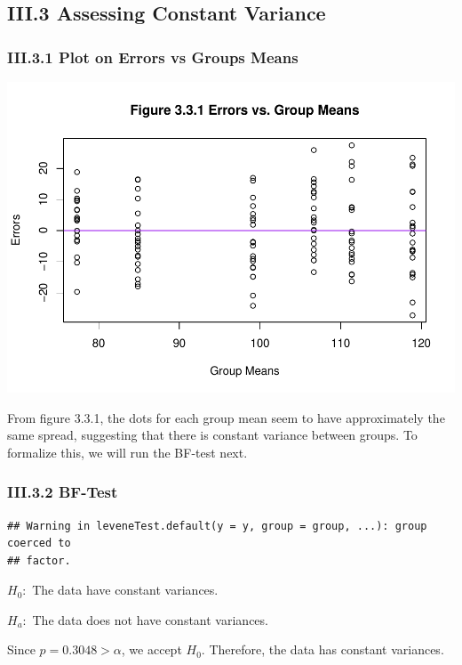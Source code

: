 \documentclass[
]{article}
\begin{document}
\subsection{III.3 Assessing Constant
Variance}\label{iii.3-assessing-constant-variance}

\subsubsection{III.3.1 Plot on Errors vs Groups
Means}\label{iii.3.1-plot-on-errors-vs-groups-means}

\includegraphics{STA_106_Project_2_files/figure-latex/unnamed-chunk-6-1.pdf}

From figure 3.3.1, the dots for each group mean seem to have
approximately the same spread, suggesting that there is constant
variance between groups. To formalize this, we will run the BF-test
next.

\subsubsection{III.3.2 BF-Test}\label{iii.3.2-bf-test}

\begin{verbatim}
## Warning in leveneTest.default(y = y, group = group, ...): group coerced to
## factor.
\end{verbatim}

\(H_0:\) The data have constant variances.

\(H_a:\) The data does not have constant variances.

Since \(p = 0.3048 > \alpha\), we accept \(H_0\). Therefore, the data
has constant variances.
\end{document}
